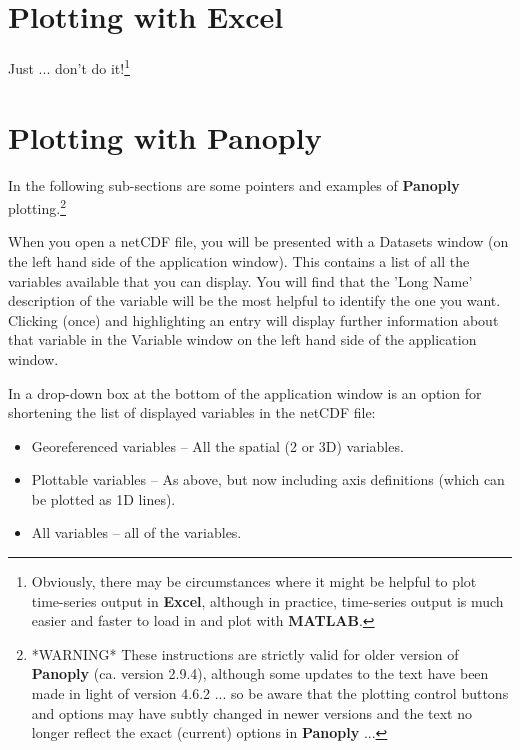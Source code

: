 \documentclass[11pt,fleqn]{book} %
\begin{document}

\newpage


\section{Plotting with Excel}

Just ... don't do it!\footnote{Obviously, there may be circumstances where it might be helpful to plot time-series output in \textbf{Excel}, although in practice, time-series output is much easier and faster to load in and plot with \textbf{MATLAB}.}


\newpage


\section{Plotting with Panoply}

In the following sub-sections are some pointers and examples of \textbf{Panoply} plotting.\footnote{*WARNING* These instructions are strictly valid for older version of \textbf{Panoply} (ca. version 2.9.4), although some updates to the text have been made in light of version 4.6.2 ... so be aware that the plotting control buttons and options may have subtly changed in newer versions and the text no longer reflect the exact (current) options in \textbf{Panoply} ...}
 
When you open a netCDF file, you will be presented with a \footnotesize\textsf{Datasets }\normalsize window (on the left hand side of the application window). This contains a list of all the variables available that you can display. You will find that the 'Long Name' description of the variable will be the most helpful to identify the one you want. Clicking (once) and highlighting an entry will display further information about that variable in the \footnotesize\textsf{Variable }\normalsize window on the left hand side of the application window.

In a drop-down box at the bottom of the application window is an option for shortening the list of displayed variables in the netCDF file:

\begin{itemize}[noitemsep]
\vspace{1mm}
\item \footnotesize\textsf{Georeferenced variables }\normalsize -- All the spatial (2 or 3D) variables.
\vspace{1mm}
\item \footnotesize\textsf{Plottable variables }\normalsize -- As above, but now including axis definitions (which can be plotted as 1D lines).
\vspace{1mm}
\item \footnotesize\textsf{All variables }\normalsize -- all of the variables.
\end{itemize}
\vspace{2mm}
\end{document}
